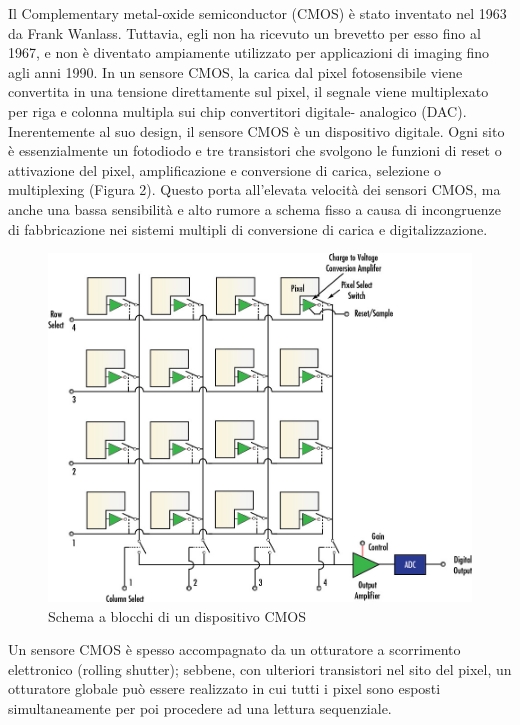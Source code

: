 Il Complementary metal-oxide semiconductor (CMOS) è stato inventato nel 1963
da Frank Wanlass. Tuttavia, egli non ha ricevuto un brevetto per esso fino al
1967, e non è diventato ampiamente utilizzato per applicazioni di imaging fino
agli anni 1990. In un sensore CMOS, la carica dal pixel fotosensibile viene
convertita in una tensione direttamente sul pixel, il segnale viene
multiplexato per riga e colonna multipla sui chip convertitori digitale-
analogico (DAC). Inerentemente al suo design, il sensore CMOS è un dispositivo
digitale. Ogni sito è essenzialmente un fotodiodo e tre transistori che
svolgono le funzioni di reset o attivazione del pixel, amplificazione e
conversione di carica,  selezione o multiplexing (Figura 2). Questo porta
all'elevata velocità dei sensori CMOS, ma anche una bassa sensibilità e alto
rumore a schema fisso a causa di incongruenze di fabbricazione nei sistemi
multipli di conversione di carica e digitalizzazione.
\begin{figure}[!ht]
\centering

\includegraphics[width=\textwidth]{img/cmos-blockdiagram.jpeg}

\caption{Schema a blocchi di un dispositivo CMOS}
\label{fig:ccd-blockdiagram}
\end{figure}

Un sensore CMOS è spesso accompagnato da un otturatore a scorrimento
elettronico (rolling shutter); sebbene, con ulteriori transistori nel sito del
pixel, un otturatore globale può essere realizzato in cui tutti i pixel sono
esposti simultaneamente per poi procedere ad una lettura sequenziale.

